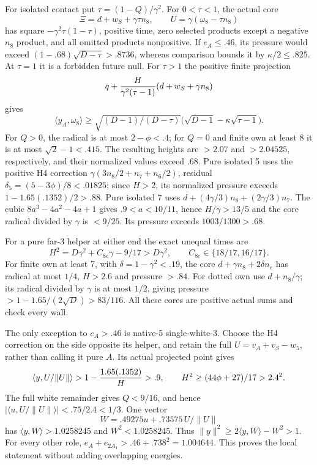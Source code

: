 \documentclass[11pt]{article}
\theoremstyle{definition}
\theoremstyle{remark}
\newcommand{\ip}[2]{\langle #1,#2\rangle}
\newcommand{\norm}[1]{\lVert #1\rVert}
\begin{document}
For isolated contact put \(\tau=(1-Q)/\gamma^2\).
For \(0<\tau<1\), the actual core
\[
 \Xi=d+w_S+\gamma\tau n_8,\qquad
 U=\gamma(\omega_8-\tau n_8)
\]
has square \(-\gamma^2\tau(1-\tau)\), positive time,
zero selected products except a negative \(n_8\) product,
and all omitted products nonpositive.
If \(e_A\le.46\), its pressure would exceed
\((1-.68)\sqrt{D-\tau}>.8736\), whereas comparison bounds
it by \(\kappa/2\le.825\).
At \(\tau=1\) it is a forbidden future null.
For \(\tau>1\) the positive finite projection
\[
 q+{H\over\gamma^2(\tau-1)}
          (d+w_S+\gamma n_8)
\]
gives
\[
 \ip{y_A}{\omega_8}\ge
 \sqrt{(D-1)/(D-\tau)}
       \bigl(\sqrt{D-1}-\kappa\sqrt{\tau-1}\bigr).
\]
For \(Q>0\), the radical is at most \(2-\phi<.4\);
for \(Q=0\) and finite own at least 8 it is at most
\(\sqrt2-1<.415\).  The resulting heights are
\(>2.07\) and \(>2.04525\), respectively, and their normalized
values exceed \(.68\).
Pure isolated 5 uses the positive H4 correction
\(\gamma(3n_8/2+n_7+n_6/2)\), residual
\(\delta_5=(5-3\phi)/8<.01825\);
since \(H>2\), its normalized pressure exceeds
\(1-1.65(.1352)/2>.88\).
Pure isolated 7 uses \(d+(4\gamma/3)n_8+(2\gamma/3)n_7\).
The cubic \(8a^3-4a^2-4a+1\) gives
\(.9<a<10/11\), hence \(H/\gamma>13/5\) and the
core radical divided by \(\gamma\) is \(<9/25\).
Its pressure exceeds \(1003/1300>.68\).

For a pure far-3 helper at either end the exact unequal times are
\[
 H^2=D\gamma^2+C_{8e}\gamma-9/17>D\gamma^2,\qquad
 C_{8e}\in\{18/17,16/17\}.
\]
For finite own at least 7, with \(\delta=1-\gamma^2<.19\),
the core \(d+\gamma n_8+2\delta n_e\) has radical at most \(1/4\),
\(H>2.6\) and pressure \(>.84\).
For dotted own use \(d+n_8/\gamma\); its radical divided by
\(\gamma\) is at most \(1/2\), giving pressure
\(>1-1.65/(2\sqrt D)>83/116\).
All these cores are positive actual sums and check every wall.

The only exception to \(e_A>.46\) is native-5 single-white-3.
Choose the H4 correction on the side opposite its helper, and retain
the full \(U=v_A+v_S-w_5\), rather than calling it pure \(A\).
Its actual projected point gives
\[
 \ip y{U/\norm U}>
 1-{1.65(.1352)\over H}>.9,
 \qquad H^2\ge(44\phi+27)/17>2.4^2 .
\]
The full white remainder gives \(Q<9/16\), and hence
\(\lvert\ip u{U/\norm U}\rvert<.75/2.4<1/3\).
One vector
\[
 W=.49275u+.73575\,U/\norm U
\]
has \(\ip yW>1.0258245\) and \(W^2<1.0258245\).
Thus \(\norm y^2\ge2\ip yW-W^2>1\).
For every other role,
\(e_A+e_{2A_1}>.46+.738^2=1.004644\).
This proves the local statement without adding overlapping energies.
\end{document}
